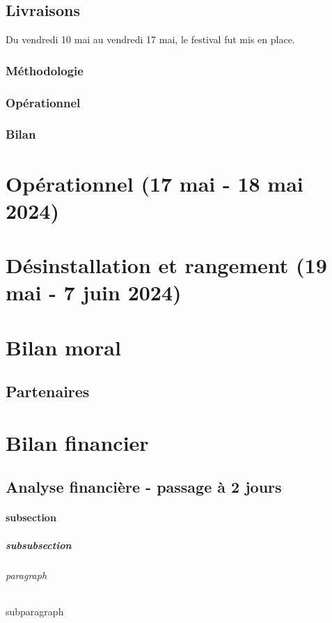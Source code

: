 \documentclass[12pt,a4paper]{report}
\begin{document}
\chapter{Livraisons}
Du vendredi 10 mai au vendredi 17 mai, le festival fut mis en place. 
\section{Méthodologie}


\section{Opérationnel}

\section{Bilan}

\part{Opérationnel (17 mai - 18 mai 2024)}

\part{Désinstallation et rangement (19 mai - 7 juin 2024)}

\part{Bilan moral}
\chapter{Partenaires}

\part{Bilan financier}
\chapter{Analyse financière - passage à 2 jours}

\subsection{subsection}
\subsubsection{subsubsection}
\paragraph{paragraph}
\subparagraph{subparagraph}
\end{document}
